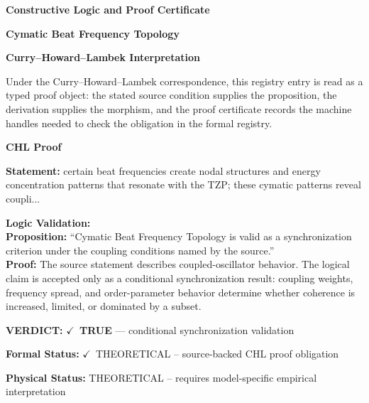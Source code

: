 \clearpage
\begingroup\tzpsupportsetup
\noindent\textbf{\fontsize{10.8pt}{12.8pt}\selectfont [ID 0099] Constructive Logic and Proof Certificate}\par
\noindent\textbf{\fontsize{10pt}{12pt}\selectfont Cymatic Beat Frequency Topology}\par
\vspace{0.45em}
\begingroup
\footnotesize
\setlength{\parskip}{0.22em}
\setlength{\parindent}{0pt}
\noindent\textbf{Curry--Howard--Lambek Interpretation}\par
Under the Curry--Howard--Lambek correspondence, this registry entry is read as a typed proof
object: the stated source condition supplies the proposition, the derivation supplies the
morphism, and the proof certificate records the machine handles needed to check the obligation
in the formal registry.

\vspace{0.45em}
\noindent\textbf{CHL Proof}\par
\textbf{Statement:} certain beat frequencies create nodal structures and energy concentration patterns that
resonate with the TZP; these cymatic patterns reveal coupli...

\textbf{Logic Validation:}\\
\textbf{Proposition:} ``Cymatic Beat Frequency Topology is valid as a synchronization criterion under the
coupling conditions named by the source.''\\
\textbf{Proof:} The source statement describes coupled-oscillator behavior. The logical claim is
accepted only as a conditional synchronization result: coupling weights, frequency
spread, and order-parameter behavior determine whether coherence is increased, limited,
or dominated by a subset.

\textbf{VERDICT:} \ensuremath{\checkmark}\ \textbf{TRUE} --- conditional synchronization validation

\textbf{Formal Status:} \ensuremath{\checkmark}\ THEORETICAL -- source-backed CHL proof obligation

\textbf{Physical Status:} THEORETICAL -- requires model-specific empirical interpretation
\par\vspace{0.45em}
\par
\ifTZPDarkEdition
{}
\fi
\endgroup
\endgroup
